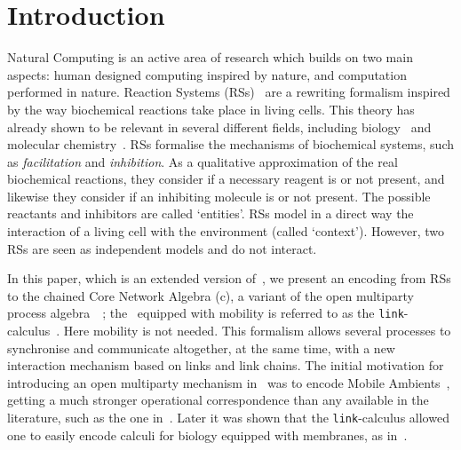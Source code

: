 
\section{Introduction}

Natural Computing is an active area of research which builds on two main 
aspects: human designed computing inspired by nature, and computation 
performed in nature. Reaction Systems (RSs)~\cite{BEMR11} are 
a rewriting formalism
inspired by the way biochemical reactions take place in living 
cells.  
This theory has already shown to be relevant in several different 
fields, 
including biology~\cite{ABP14,CMMBM12,Az17,BarbutiGLM16}
and molecular chemistry~\cite{OY16}.
RSs formalise the mechanisms of biochemical systems, 
such as {\em facilitation} and {\em inhibition}. 
As a qualitative approximation of the real biochemical reactions, they
consider if a necessary reagent is or not present, and likewise they
consider if an inhibiting molecule is or not present. 
The  possible reactants and inhibitors are called `entities'.
RSs model in a direct way the interaction of a living cell
with the environment (called `context'). However, two RSs are seen
as independent models and do not interact.


In this paper, which is an extended version of~\cite{BBF19},
we present an encoding
from RSs
to the chained Core Network  Algebra (c\CNA), a variant of the 
 open multiparty process algebra~\CNA~\cite{BBB17}; the \CNA~equipped with mobility is referred to as the {\tt link}-calculus~\cite{BodeiBB12,BODEI2020104587}.
 Here mobility is not needed.
This formalism allows several processes to synchronise and 
communicate altogether, at the same time, with a new interaction
mechanism based on links and link chains. 
The initial motivation for introducing
an open multiparty mechanism in~\cite{BodeiBB12}
was to encode
Mobile Ambients~\cite{CardelliG00}, getting a much stronger operational
correspondence than any available in the literature, such as the one in~\cite{B16}.
Later it was shown that the {\tt link}-calculus allowed one to easily encode calculi for biology equipped with membranes, as in~\cite{BodeiBBC14}.

